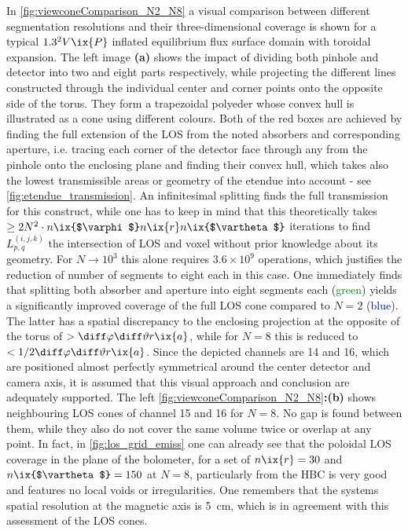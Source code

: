             In \cref{fig:viewconeComparison_N2_N8} a visual comparison between different segmentation resolutions and their three-dimensional coverage is shown for a typical $1.3^{2}V\ix{P}$ inflated equilibrium flux surface domain with toroidal expansion. The left image \textbf{(a)} shows the impact of dividing both pinhole and detector into two and eight parts respectively, while projecting the different lines constructed through the individual center and corner points onto the opposite side of the torus. They form a trapezoidal polyeder whose convex hull is illustrated as a cone using different colours. Both of the red boxes are achieved by finding the full extension of the LOS from the noted absorbers and corresponding aperture, i.e. tracing each corner of the detector face through any from the pinhole onto the enclosing plane and finding their convex hull, which takes also the lowest transmissible areas or geometry of the etendue into account - see \cref{fig:etendue_transmission}. An infinitesimal splitting finds the full transmission for this construct, while one has to keep in mind that this theoretically takes $\ge 2N^{2}\cdot n\ix{$\varphi$}n\ix{r}n\ix{$\vartheta$}$ iterations to find $L^{\left(i,j,k\right)}_{p,q}$ the intersection of LOS and voxel without prior knowledge about its geometry. For $N\rightarrow10^{3}$ this alone requires $3.6\times10^{9}$ operations, which justifies the reduction of number of segments to eight each in this case. One immediately finds that splitting both absorber and aperture into eight segments each (\textcolor{green}{green}) yields a significantly improved coverage of the full LOS cone compared to $N=2$ (\textcolor{blue}{blue}). The latter has a spatial discrepancy to the enclosing projection at the opposite of the torus of $>\diff\varphi\diff\vartheta r\ix{a}$, while for $N=8$ this is reduced to $<1/2\diff\varphi\diff\vartheta r\ix{a}$. Since the depicted channels are 14 and 16, which are positioned almost perfectly symmetrical around the center detector and camera axis, it is assumed that this visual approach and conclusion are adequately supported. The left \cref{fig:viewconeComparison_N2_N8}\textbf{:(b)} shows neighbouring LOS cones of channel 15 and 16 for $N=8$. No gap is found between them, while they also do not cover the same volume twice or overlap at any point. In fact, in \cref{fig:los_grid_emiss} one can already see that the poloidal LOS coverage in the plane of the bolometer, for a set of $n\ix{r}=30$ and $n\ix{$\vartheta$}=150$ at $N=8$, particularly from the HBC is very good and features no local voids or irregularities. One remembers that the systems spatial resolution at the magnetic axis is \SI{5}{\centi\meter}, which is in agreement with this assessment of the LOS cones.\\%
